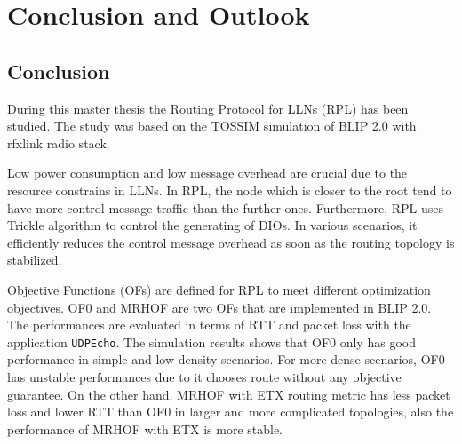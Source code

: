 \chapter{Conclusion and Outlook}
\label{Con}
\section{Conclusion}
\label{Con:Con}
During this master thesis the Routing Protocol for LLNs (RPL) has been studied. The study was based on the TOSSIM simulation of BLIP 2.0 with rfxlink radio stack. 
\newline

Low power consumption and low message overhead are crucial due to the resource constrains in LLNs. In RPL, the node which is closer to the root tend to have more control message traffic than the further ones. Furthermore, RPL uses Trickle algorithm to control the generating of DIOs. In various scenarios, it efficiently reduces the control message overhead as soon as the routing topology is stabilized.   
\newline

Objective Functions (OFs) are defined for RPL to meet different optimization objectives. OF0 and MRHOF are two OFs that are implemented in BLIP 2.0. The performances are evaluated in terms of RTT and packet loss with the application \texttt{UDPEcho}\@. The simulation results shows that OF0 only has good performance in simple and low density scenarios. For more dense scenarios, OF0 has unstable performances due to it chooses route without any objective guarantee. On the other hand, MRHOF with ETX routing metric has less packet loss and lower RTT than OF0 in larger and more complicated topologies, also the performance of MRHOF with ETX is more stable.  
\newline

